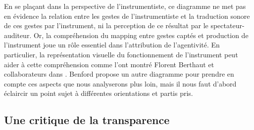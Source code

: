 \indent En se plaçant dans la perspective de l'instrumentiste, ce diagramme ne met pas en évidence la relation entre les gestes de l'instrumentiste et la traduction sonore de ces gestes par l'instrument, ni la perception de ce résultat par le spectateur-auditeur. Or, la compréhension du mapping entre gestes captés et production de l'instrument joue un rôle essentiel dans l'attribution de l'agentivité. En particulier, la représentation visuelle du fonctionnement de l'instrument peut aider à cette compréhension comme l'ont montré Florent Berthaut et collaborateurs dans \cite{berthaut_rouages:_2013, berthaut_liveness_2015}. Benford propose un autre diagramme pour prendre en compte ces aspects que nous analyserons plus loin, mais il nous faut d'abord éclaircir un point sujet à différentes orientations et partis pris.

\subsection{Une critique de la transparence}
\label{sec:gesture:critique_transparency}

